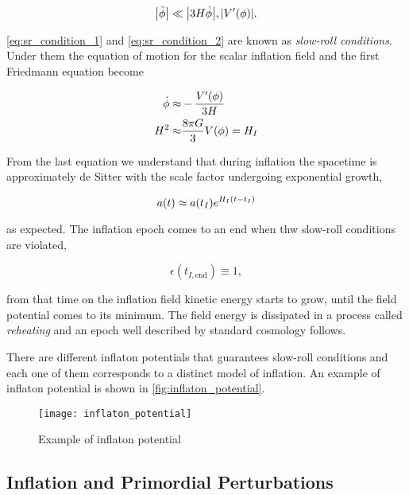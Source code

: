 \begin{equation}
        \abs{\ddot\phi} \ll \abs{3H\dot\phi}, \abs{V'\qty(\phi)}.
        \label{eq:sr_condition_2}
\end{equation}

\autoref{eq:sr_condition_1} and \autoref{eq:sr_condition_2} are known as
\emph{slow-roll conditions}. Under them the equation of motion for the
scalar inflation field and the first Friedmann equation become

\begin{align}
        \dot\phi \approx & -\frac{V'\qty(\phi)}{3H}  \\
        H^2 \approx & \frac{8\pi G}{3} V\qty(\phi) = H_I
\end{align}

From the last equation we understand that during inflation the spacetime is
approximately de Sitter with the scale factor undergoing exponential growth,

\begin{equation}
        a\qty(t) \approx a\qty(t_I)e^{H_I\qty(t - t_I)}
\end{equation}

as expected. The inflation epoch comes to an end when thw slow-roll
conditions are violated,

\begin{equation}
        \epsilon(t_{I,\text{end}}) \equiv 1,
\end{equation}

from that time on the inflation field kinetic energy starts to grow,
until the field potential comes to its minimum. The field energy is
dissipated in a process called \emph{reheating} and an epoch well
described by standard cosmology follows.

There are different inflaton potentials that guarantees slow-roll
conditions and each one of them corresponds to a distinct model of
inflation. An example of inflaton potential is shown in
\autoref{fig:inflaton_potential}.

\begin{figure}
        \centering
        \texttt{[image: inflaton\_potential]}
        \caption{Example of inflaton potential}
        \label{fig:inflaton_potential}
\end{figure}

\subsection{Inflation and Primordial Perturbations}

